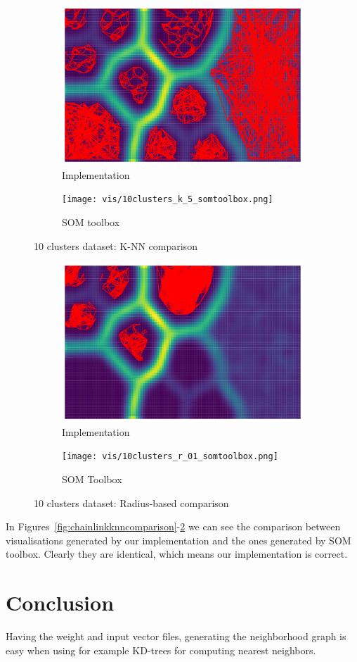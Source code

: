 \documentclass[12pt]{article}
\begin{document}
\begin{figure}[t]
    \centering
    \begin{subfigure}{.5\textwidth}
      \centering
      \includegraphics[width=.9\linewidth]{vis/10clusters_k_5.png}
      \caption{Implementation}
    \end{subfigure}%
    \begin{subfigure}{.5\textwidth}
      \centering
      \texttt{[image: vis/10clusters\_k\_5\_somtoolbox.png]}
      \caption{SOM toolbox}
    \end{subfigure}
    \caption{10 clusters dataset: K-NN comparison}
    \label{fig:10clustersknncomparison}
\end{figure}
\begin{figure}[t]
    \centering
    \begin{subfigure}{.5\textwidth}
        \centering
        \includegraphics[width=.9\linewidth]{vis/10clusters_r_01.png}
        \caption{Implementation}
    \end{subfigure}%
    \begin{subfigure}{.5\textwidth}
        \centering
        \texttt{[image: vis/10clusters\_r\_01\_somtoolbox.png]}
        \caption{SOM Toolbox}
    \end{subfigure}
    \caption{10 clusters dataset: Radius-based comparison}
    \label{fig:10clustersradiuscomparison}
\end{figure}
In Figures~\ref{fig:chainlinkknncomparison}-\ref{fig:10clustersradiuscomparison} we can see the comparison between visualisations generated by our implementation and the ones generated by SOM toolbox.
Clearly they are identical, which means our implementation is correct.

\section{Conclusion}
Having the weight and input vector files, generating the neighborhood graph is easy when using for example KD-trees for computing nearest neighbors.
\end{document}
